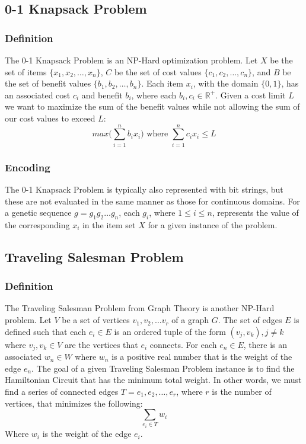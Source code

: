 %
%
\subsection*{0-1 Knapsack Problem}
\subsubsection*{Definition}

The 0-1 Knapsack Problem is an NP-Hard optimization problem. Let $X$ be the set of items $\{x_1, x_2, \ldots, x_n\}$, $C$ be the set of cost values $\{c_1, c_2, \ldots, c_n\}$, and $B$ be the set of benefit values $\{b_1, b_2, \ldots, b_n\}$. Each item $x_i$, with the domain $\{0,1\}$, has an associated cost $c_i$ and benefit $b_i$, where each $b_i,c_i \in \mathbb{R}^{+}$. Given a cost limit $L$ we want to maximize the sum of the benefit values while not allowing the sum of our cost values to exceed $L$:
\[ max\big( \sum\limits_{i = 1}^{n} b_ix_i \big) \text{ where } \sum\limits_{i = 1}^{n} c_ix_i \leq L \]

\subsubsection*{Encoding}
The  0-1 Knapsack Problem is typically also represented with bit strings, but these are not evaluated in the same manner as those for continuous domains. For a genetic sequence $g = g_1 g_2 \ldots g_n$, each $g_i$, where $1 \leq i \leq n$, represents the value of the corresponding $x_i$ in the item set $X$ for a given instance of the problem. 

%
%
\subsection*{Traveling Salesman Problem}
\subsubsection*{Definition}
The Traveling Salesman Problem from Graph Theory is another NP-Hard problem. Let $V$ be a set of vertices $v_1, v_2, \ldots v_r$ of a graph $G$. The set of edges $E$ is defined such that each $e_i \in E$ is an ordered tuple of the form $(v_j,v_k), j \not = k$ where $v_j,v_k \in V$ are the vertices that $e_i$ connects. For each $e_n \in E$, there is an associated $w_n \in W$ where $w_n$ is a positive real number that is the weight of the edge $e_n$. The goal of a given Traveling Salesman Problem instance is to find the Hamiltonian Circuit that has the minimum total weight. In other words, we must find a series of connected edges $T = e_{1},e_{2},\ldots,e_{r}$, where $r$ is the number of vertices, that minimizes the following\cite{Haxhimusa11}:
\[\sum\limits_{e_{i} \in T} w_{i}\]
\noindent Where $w_{i}$ is the weight of the edge $e_{i}$.

